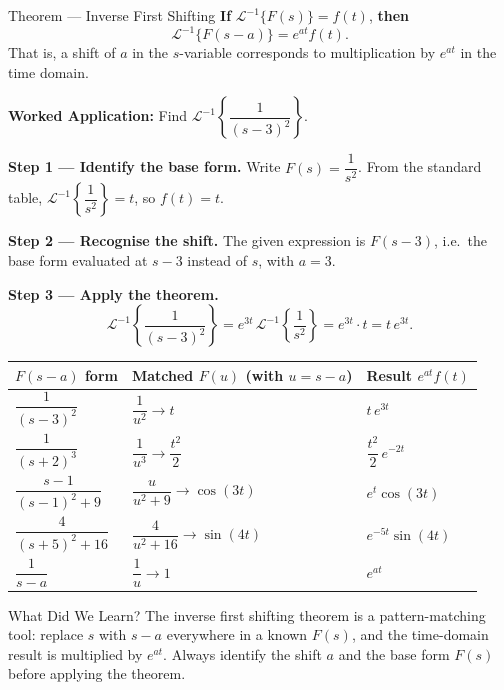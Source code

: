 \documentclass[12pt,a4paper]{article}
\begin{document}
\begin{infobox}{Theorem --- Inverse First Shifting}
\textbf{If} $\mathcal{L}^{-1}\{F(s)\} = f(t)$, \textbf{then}
\[
  \mathcal{L}^{-1}\{F(s-a)\} = e^{at}f(t).
\]
That is, a shift of $a$ in the $s$-variable corresponds to multiplication
by $e^{at}$ in the time domain.

\medskip
\textbf{Worked Application:} Find $\mathcal{L}^{-1}\!\left\{\dfrac{1}{(s-3)^2}\right\}$.

\textbf{Step 1 --- Identify the base form.}
Write $F(s) = \dfrac{1}{s^2}$. From the standard table,
$\mathcal{L}^{-1}\!\left\{\dfrac{1}{s^2}\right\} = t$, so $f(t)=t$.

\textbf{Step 2 --- Recognise the shift.}
The given expression is $F(s-3)$, i.e.~the base form evaluated at $s-3$
instead of $s$, with $a=3$.

\textbf{Step 3 --- Apply the theorem.}
\[
  \mathcal{L}^{-1}\!\left\{\frac{1}{(s-3)^2}\right\}
  = e^{3t}\,\mathcal{L}^{-1}\!\left\{\frac{1}{s^2}\right\}
  = e^{3t}\cdot t = t\,e^{3t}.
\]
\end{infobox}

\medskip
\begin{center}
\begin{tabular}{@{}lll@{}}
\toprule
$F(s-a)$ form & Matched $F(u)$ (with $u=s-a$) & Result $e^{at}f(t)$ \\
\midrule
$\dfrac{1}{(s-3)^2}$ & $\dfrac{1}{u^2} \to t$ & $t\,e^{3t}$ \\[8pt]
$\dfrac{1}{(s+2)^3}$ & $\dfrac{1}{u^3} \to \dfrac{t^2}{2}$ & $\dfrac{t^2}{2}\,e^{-2t}$ \\[8pt]
$\dfrac{s-1}{(s-1)^2+9}$ & $\dfrac{u}{u^2+9} \to \cos(3t)$ & $e^{t}\cos(3t)$ \\[8pt]
$\dfrac{4}{(s+5)^2+16}$ & $\dfrac{4}{u^2+16} \to \sin(4t)$ & $e^{-5t}\sin(4t)$ \\[8pt]
$\dfrac{1}{s-a}$ & $\dfrac{1}{u} \to 1$ & $e^{at}$ \\[4pt]
\bottomrule
\end{tabular}
\end{center}

\begin{learnbox}{What Did We Learn?}
The inverse first shifting theorem is a pattern-matching tool: replace $s$
with $s-a$ everywhere in a known $F(s)$, and the time-domain result is
multiplied by $e^{at}$. Always identify the shift $a$ and the base form
$F(s)$ before applying the theorem.
\end{learnbox}
\end{document}
